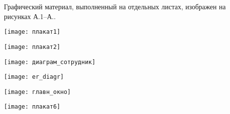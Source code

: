 
Графический материал, выполненный на отдельных листах,
изображен на рисунках А.1--А..
\setcounter{числоПлакатов}{0}

\renewcommand{\thefigure}{А.\arabic{figure}} %



\begin{плакат}
    \texttt{[image: плакат1]}
    \label{pl1:image}      
\end{плакат}

\begin{плакат}
    \texttt{[image: плакат2]}
    \label{pl2:image}      
\end{плакат}

\begin{плакат}
    \texttt{[image: диаграм\_сотрудник]}
    \label{pl3:image}      
\end{плакат}

\begin{плакат}
    \texttt{[image: er\_diagr]}
    \label{pl4:image}      
\end{плакат}

\begin{плакат}
	\texttt{[image: главн\_окно]}
	\label{pl5:image}      
\end{плакат}

\begin{плакат}
	\texttt{[image: плакат6]}
	\label{pl6:image}      
\end{плакат}

